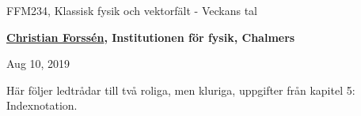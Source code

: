 \documentclass[%
oneside,                 %
final,                   %
10pt]{article}
\begin{document}

\newcommand{\exercisesection}[1]{\subsection*{#1}}







\thispagestyle{empty}

\begin{center}
{\LARGE\bf
\begin{spacing}{1.25}
FFM234, Klassisk fysik och vektorfält - Veckans tal
\end{spacing}
}
\end{center}


\begin{center}
{\bf \href{{http://fy.chalmers.se/subatom/tsp/}}{Christian Forssén}, Institutionen för  fysik, Chalmers${}^{}$} \\ [0mm]
\end{center}

\begin{center}
\end{center}
    

\begin{center}
Aug 10, 2019
\end{center}

\vspace{1cm}


Här följer ledtrådar till två roliga, men kluriga, uppgifter från kapitel 5: Indexnotation.
\end{document}
